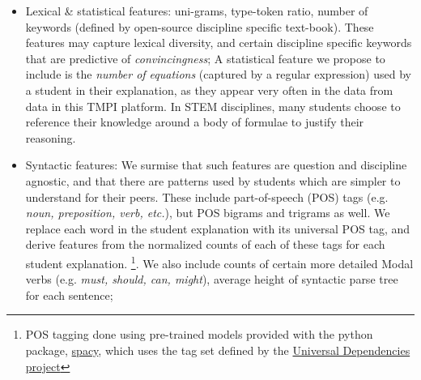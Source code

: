 \documentclass[notitlepage,12pt]{jedm}
\begin{document}
\begin{itemize}
	
	\item Lexical \& statistical features: 
	uni-grams, 
	type-token ratio, 
	number of keywords (defined by open-source discipline specific 
	text-book).
	These features may capture lexical diversity, and certain discipline 
	specific keywords that are predictive of \textit{convincingness};
	A statistical feature we propose to include is the \textit{number of 
	equations} (captured by a regular expression) used by a student in their 
	explanation, as they appear very often in the data from data in this TMPI 
	platform.
	In STEM disciplines, many students choose to reference their knowledge 
	around a body of formulae to justify their reasoning. 
	
	\item Syntactic features: 
	We surmise that such features are question and discipline agnostic, and 
	that there are patterns used by students which are simpler to 
	understand for their peers.
	These include part-of-speech (POS) tags (e.g. \textit{noun, preposition, 
	verb, etc.}), but POS bigrams and trigrams as well. 
	We replace each word in the student explanation with its universal POS tag, 
	and derive features from the normalized counts of each of these tags for 
	each student explanation. 
	\footnote{POS tagging done using pre-trained models provided with the 
	python package, \href{spacy.io}{spacy}, which uses the tag set defined by 
	the  \href{https://universaldependencies.org/docs/u/pos/}{Universal 
	Dependencies project}}.
	We also include counts of certain more detailed 
	Modal verbs (e.g. \textit{must, should, can, might}),
	average height of syntactic parse tree for each sentence;
	

\end{itemize}
\end{document}
